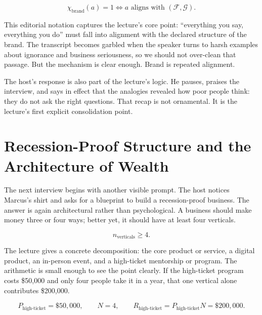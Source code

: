 \begin{equation}
\chi_{\text{brand}}(a)=1
\iff
a \text{ aligns with }(\mathcal{F},\mathcal{G}).
\end{equation}

This editorial notation captures the lecture's core point: ``everything you say, everything you do'' must fall into alignment with the declared structure of the brand. The transcript becomes garbled when the speaker turns to harsh examples about ignorance and business seriousness, so we should not over-clean that passage. But the mechanism is clear enough. Brand is repeated alignment.

The host's response is also part of the lecture's logic. He pauses, praises the interview, and says in effect that the analogies revealed how poor people think: they do not ask the right questions. That recap is not ornamental. It is the lecture's first explicit consolidation point.

\section{Recession-Proof Structure and the Architecture of Wealth}

The next interview begins with another visible prompt. The host notices Marcus's shirt and asks for a blueprint to build a recession-proof business. The answer is again architectural rather than psychological. A business should make money three or four ways; better yet, it should have at least four verticals.

\begin{equation}
n_{\text{verticals}}\ge 4.
\end{equation}

The lecture gives a concrete decomposition: the core product or service, a digital product, an in-person event, and a high-ticket mentorship or program. The arithmetic is small enough to see the point clearly. If the high-ticket program costs \$50{,}000 and only four people take it in a year, that one vertical alone contributes \$200{,}000.

\begin{equation}
P_{\text{high-ticket}}=\$50{,}000,
\qquad
N=4,
\qquad
R_{\text{high-ticket}}=P_{\text{high-ticket}}N=\$200{,}000.
\end{equation}

\begin{figure}
\centering
{}
\end{figure}

